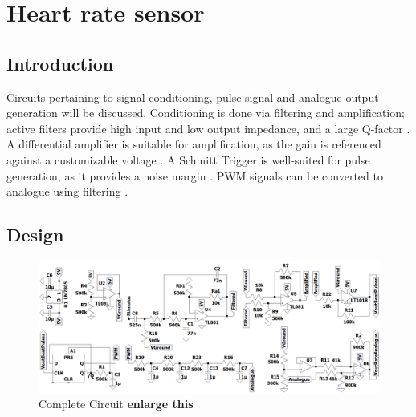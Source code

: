 \chapter{Heart rate sensor}\label{ch:heartRate}

\section{Introduction} \label{sec:heartIntro}
Circuits pertaining to signal conditioning, pulse signal and analogue output generation will be discussed. Conditioning is done via filtering and amplification; active filters provide high input and low output impedance, and a large Q-factor \cite{actpas}. A differential amplifier is suitable for amplification, as the gain is referenced against a customizable voltage \cite{opamp}. A Schmitt Trigger is well-suited for pulse generation, as it provides a noise margin \cite{schmitt}. PWM signals can be converted to analogue using filtering \cite{PWM}. 

\section{Design} \label{sec:heartDesign}
\begin{figure}[h]
    \centering
    \vspace{-1cm}
    \includegraphics[width = 1\textwidth]{Figures/circuit}
    \caption{Complete Circuit \textbf{enlarge this}}
    \label{fig:circuit}
\end{figure}

